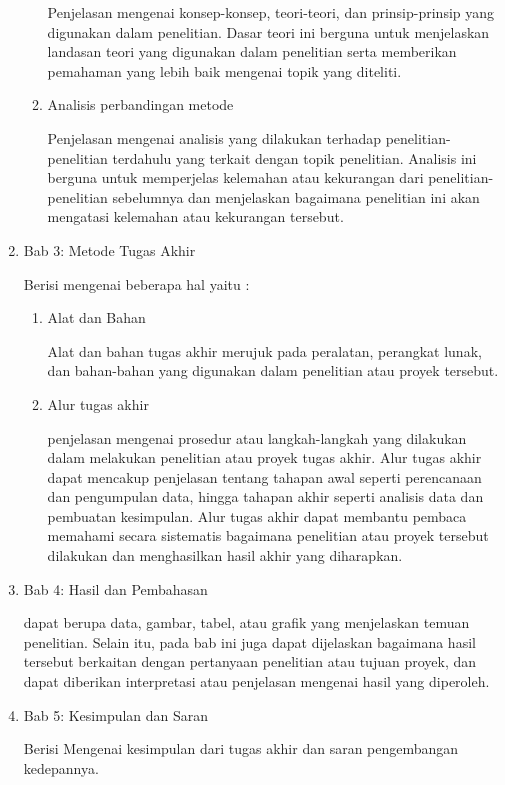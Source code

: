 \begin{enumerate}
\begin{enumerate}[label=\alph*.]
			Penjelasan mengenai konsep-konsep, teori-teori, dan prinsip-prinsip yang digunakan dalam penelitian. Dasar teori ini berguna untuk menjelaskan landasan teori yang digunakan dalam penelitian serta memberikan pemahaman yang lebih baik mengenai topik yang diteliti.
			\item Analisis perbandingan metode
	
			Penjelasan mengenai analisis yang dilakukan terhadap penelitian-penelitian terdahulu yang terkait dengan topik penelitian. Analisis ini berguna untuk memperjelas kelemahan atau kekurangan dari penelitian-penelitian sebelumnya dan menjelaskan bagaimana penelitian ini akan mengatasi kelemahan atau kekurangan tersebut.
		\end{enumerate}

		\item Bab 3: Metode Tugas Akhir

		Berisi mengenai beberapa hal yaitu :
		\begin{enumerate}[label=\alph*.]
			\item Alat dan Bahan
			
			Alat dan bahan tugas akhir merujuk pada peralatan, perangkat lunak, dan bahan-bahan yang digunakan dalam penelitian atau proyek tersebut.
			\item Alur tugas akhir
			
			penjelasan mengenai prosedur atau langkah-langkah yang dilakukan dalam melakukan penelitian atau proyek tugas akhir. Alur tugas akhir dapat mencakup penjelasan tentang tahapan awal seperti perencanaan dan pengumpulan data, hingga tahapan akhir seperti analisis data dan pembuatan kesimpulan. Alur tugas akhir dapat membantu pembaca memahami secara sistematis bagaimana penelitian atau proyek tersebut dilakukan dan menghasilkan hasil akhir yang diharapkan.
			\end{enumerate}
		\item Bab 4: Hasil dan Pembahasan

		dapat berupa data, gambar, tabel, atau grafik yang menjelaskan temuan penelitian. Selain itu, pada bab ini juga dapat dijelaskan bagaimana hasil tersebut berkaitan dengan pertanyaan penelitian atau tujuan proyek, dan dapat diberikan interpretasi atau penjelasan mengenai hasil yang diperoleh.
	
		\item Bab 5: Kesimpulan dan Saran

		Berisi Mengenai kesimpulan dari tugas akhir dan saran pengembangan kedepannya.
	\end{enumerate}


